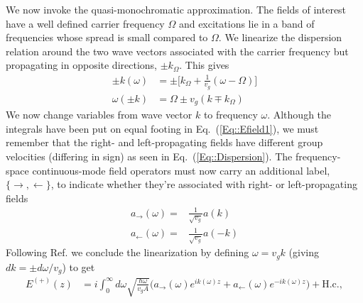 \documentclass[pra]{revtex4}
\newcommand{\fwd}{_{\rightarrow}}
\newcommand{\bwd}{_{\leftarrow}}
\newcommand{\smallfrac}[2]{\mbox{$\frac{#1}{#2}$}}
\newcommand{\erf}[1]{Eq.~(\ref{#1})}
\begin{document}
We now invoke the quasi-monochromatic approximation. The fields of interest have a well defined carrier frequency $\Omega$ and excitations lie in a band of frequencies whose spread is small compared to $\Omega$. We linearize the dispersion relation around the two wave vectors associated with the carrier frequency but propagating in opposite directions, $\pm k_{\Omega}$. This gives
 	\begin{align}
		\pm k (\omega) & = \pm \big[k_\Omega + \smallfrac{1}{v_g} (\omega - \Omega) \big] \\
		\omega(\pm k) & = \Omega \pm v_g(k \mp k_{\Omega})  \label{Eq::Dispersion}
	\end{align}
We now change variables from wave vector $k$ to frequency $\omega$. Although the integrals have been put on equal footing in \erf{Eq::Efield1}, we must remember that the right- and left-propagating fields have different group velocities (differing in sign) as seen in \erf{Eq::Dispersion}. The frequency-space continuous-mode field operators must now carry an additional label, $\{\rightarrow, \leftarrow\}$, to indicate whether they're associated with right- or left-propagating fields
	\begin{align}
		a\fwd(\omega) =& \smallfrac{1}{\sqrt{v_g}} a(k) \\
		a\bwd(\omega) = & \smallfrac{1}{\sqrt{v_g}} a(-k) 
	\end{align}
 Following Ref. \cite{} we conclude the linearization by defining $\omega = v_g k$ (giving $dk = \pm d\omega / v_g$) to get
	\begin{align}
		E^{(+)}(z) & =  i \int_0^\infty d \omega \sqrt{ \frac{ \hbar \omega }{v_g A} } \Big( a\fwd(\omega) e^{i k(\omega) z} + a\bwd(\omega) e^{-i k(\omega) z} \Big) + \mbox{H.c.},
	\end{align}
\end{document}
